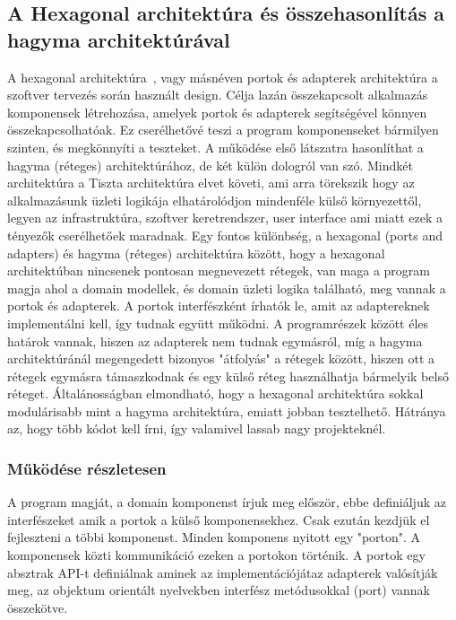 \subsection{A Hexagonal architektúra és összehasonlítás a hagyma architektúrával}\label{subsec:a-hexagonal-architektúráról-bővebben}
A hexagonal architektúra~\cite{hexagonal}, vagy másnéven portok és adapterek architektúra a szoftver tervezés során használt design.
Célja lazán összekapcsolt alkalmazás komponensek létrehozása, amelyek portok és adapterek segítségével könnyen összekapcsolhatóak.
Ez cserélhetővé teszi a program komponenseket bármilyen szinten, és megkönnyíti a teszteket.
A működése első látszatra hasonlíthat a hagyma (réteges) architektúrához, de két külön dologról van szó.
Mindkét architektúra a Tiszta architektúra \cite{clean-architecture} elvet követi, ami arra törekszik hogy az alkalmazásunk üzleti logikája elhatárolódjon mindenféle külső környezettől, legyen az infrastruktúra, szoftver keretrendszer, user interface ami miatt ezek a tényezők cserélhetőek maradnak.
Egy fontos különbség, a hexagonal (ports and adapters) és hagyma (réteges) architektúra között, hogy a hexagonal architektúban nincsenek pontosan megnevezett rétegek, van maga a program magja ahol a domain modellek, és domain üzleti logika található, meg vannak a portok és adapterek.
A portok interfészként írhatók le, amit az adaptereknek implementálni kell, így tudnak együtt működni.
A programrészek között éles határok vannak, hiszen az adapterek nem tudnak egymásról, míg a hagyma architektúránál megengedett bizonyos "átfolyás" a rétegek között, hiszen ott a rétegek egymásra támaszkodnak és egy külső réteg használhatja bármelyik belső réteget.
Általánosságban elmondható, hogy a hexagonal architektúra sokkal modulárisabb mint a hagyma architektúra, emiatt jobban tesztelhető.
Hátránya az, hogy több kódot kell írni, így valamivel lassab nagy projekteknél.

\subsubsection{Működése részletesen}
A program magját, a domain komponenst írjuk meg először, ebbe definiáljuk az interfészeket amik a portok a külső komponensekhez.
Csak ezután kezdjük el fejleszteni a többi komponenst.
Minden komponens nyitott egy "porton".
A komponensek közti kommunikáció ezeken a portokon történik.
A portok egy absztrak API-t definiálnak aminek az implementációjátaz adapterek valósítják meg, az objektum orientált nyelvekben interfész metódusokkal (port) vannak összekötve.



